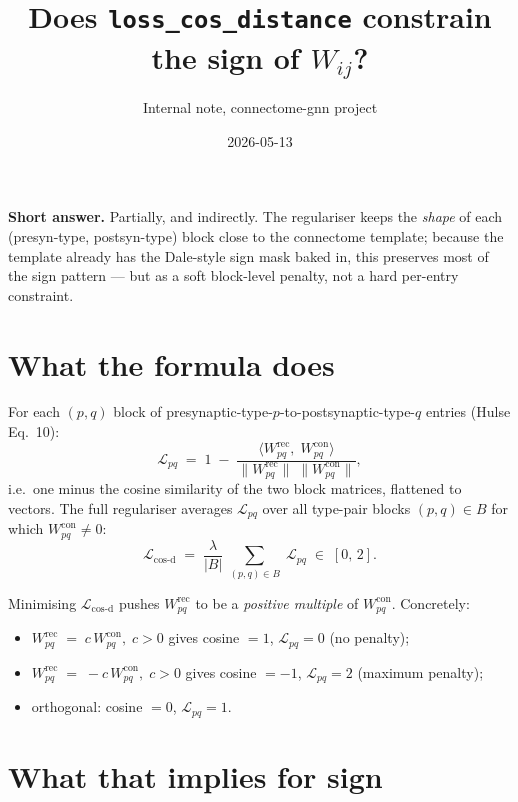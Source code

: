 \documentclass[11pt]{article}
\title{Does \texttt{loss\_cos\_distance} constrain the sign of $W_{ij}$?}
\author{Internal note, connectome-gnn project}
\date{2026-05-13}
\begin{document}
\maketitle

\textbf{Short answer.} Partially, and indirectly. The regulariser keeps the
\emph{shape} of each (presyn-type, postsyn-type) block close to the
connectome template; because the template already has the Dale-style sign
mask baked in, this preserves most of the sign pattern --- but as a soft
block-level penalty, not a hard per-entry constraint.

\section{What the formula does}

For each $(p, q)$ block of presynaptic-type-$p$-to-postsynaptic-type-$q$
entries (Hulse Eq.~10):
\begin{equation}
\mathcal{L}_{pq}
\;=\; 1 \;-\;
   \frac{\bigl\langle W^{\mathrm{rec}}_{pq},\; W^{\mathrm{con}}_{pq}\bigr\rangle}
        {\bigl\lVert W^{\mathrm{rec}}_{pq}\bigr\rVert\;
         \bigl\lVert W^{\mathrm{con}}_{pq}\bigr\rVert} ,
\end{equation}
i.e.\ one minus the cosine similarity of the two block matrices,
flattened to vectors. The full regulariser averages
$\mathcal{L}_{pq}$ over all type-pair blocks $(p,q)\in B$ for which
$W^{\mathrm{con}}_{pq}\neq 0$:
\begin{equation}
\mathcal{L}_{\cos\text{-d}}
\;=\; \frac{\lambda}{|B|}\;
      \sum_{(p,q)\in B}\;\mathcal{L}_{pq}
\;\in\; [0,\,2].
\end{equation}

Minimising $\mathcal{L}_{\cos\text{-d}}$ pushes
$W^{\mathrm{rec}}_{pq}$ to be a \emph{positive multiple} of
$W^{\mathrm{con}}_{pq}$. Concretely:
\begin{itemize}[leftmargin=*]
\item $W^{\mathrm{rec}}_{pq}\;=\;c\,W^{\mathrm{con}}_{pq},\;c>0$
      gives cosine $=1$, $\mathcal{L}_{pq}=0$ (no penalty);
\item $W^{\mathrm{rec}}_{pq}\;=\;-c\,W^{\mathrm{con}}_{pq},\;c>0$
      gives cosine $=-1$, $\mathcal{L}_{pq}=2$ (maximum penalty);
\item orthogonal: cosine $=0$, $\mathcal{L}_{pq}=1$.
\end{itemize}

\section{What that implies for sign}
\end{document}
